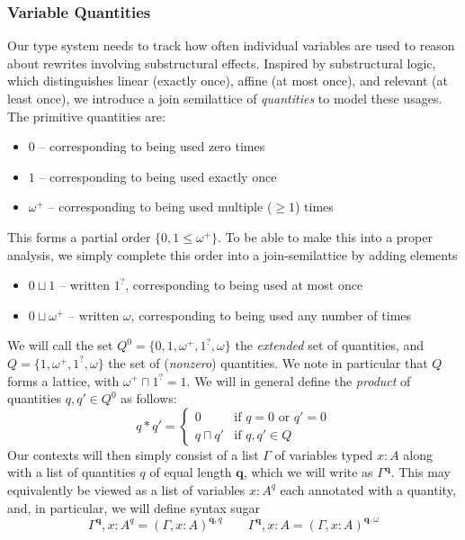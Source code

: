 \documentclass[acmsmall,screen,review]{acmart}
\newcommand{\mb}[1]{\ensuremath{\mathbf{#1}}}
\newcommand{\zeroq}{0}
\newcommand{\oneq}{1}
\newcommand{\delq}{1^?}
\newcommand{\cpyq}{\omega^+}
\newcommand{\topq}{\omega}
\begin{document}
\subsubsection{Variable Quantities}
Our type system needs to track how often individual variables are used  to reason about rewrites
involving substructural effects. Inspired by substructural logic, which distinguishes linear
(exactly once), affine (at most once), and relevant (at least once), we introduce a join
semilattice of \emph{quantities} to model these usages. The primitive quantities are:
\begin{itemize}
  \item $\zeroq$ -- corresponding to being used zero times
  \item $\oneq$ -- corresponding to being used exactly once
  \item $\cpyq$ -- corresponding to being used multiple ($\geq 1$) times
\end{itemize}
This forms a partial order $\{\zeroq, \oneq \leq \cpyq\}$. To be able to make this into a proper
analysis, we simply complete this order into a join-semilattice by adding elements
\begin{itemize}
  \item $\zeroq \sqcup \oneq$ -- written $\delq$, corresponding to being used at most once
  \item $\zeroq \sqcup \cpyq$ -- written $\topq$, corresponding to being used any number of times
\end{itemize}
We will call the set $Q^0 = \{\zeroq, \oneq, \cpyq, \delq, \topq\}$ the \emph{extended} set of
quantities, and $Q = \{\oneq, \cpyq, \delq, \topq\}$ the set of (\emph{nonzero}) quantities. We note
in particular that $Q$ forms a lattice, with $\cpyq \sqcap \delq = \oneq$. We will in general define
the \emph{product} of quantities $q, q' \in Q^0$ as follows:
\begin{equation}
  q * q' = \begin{cases}
    0 & \text{if } q = 0 \text{ or } q' = 0 \\
    q \sqcap q' & \text{if } q, q' \in Q
  \end{cases}
\end{equation}
Our contexts will then simply
consist of a list $\Gamma$ of variables typed $x : A$ along with a list of quantities $q$ of equal
length $\mb{q}$, which we will write as $\Gamma^{\mb{q}}$. This may equivalently be viewed as a list
of variables $x : A^q$ each annotated with a quantity, and, in particular, we will define syntax
sugar
\begin{equation}
  \Gamma^{\mb{q}}, x : A^q = (\Gamma, x : A)^{\mb{q}, q} \qquad
  \Gamma^{\mb{q}}, x : A =  (\Gamma, x : A)^{\mb{q}, \topq}
\end{equation}
\end{document}
